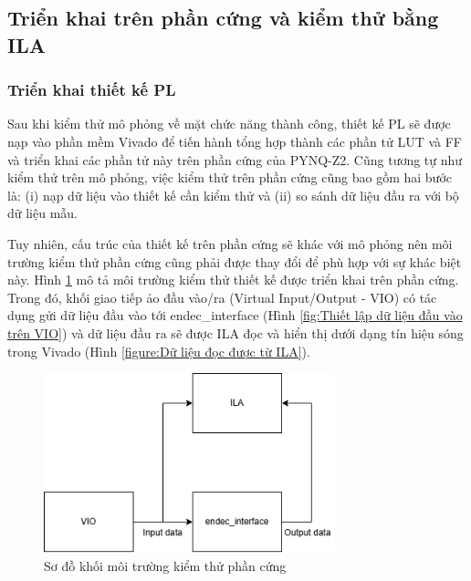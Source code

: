 \documentclass[../DoAn.tex]{subfiles}
\begin{document}
\subsection{Triển khai trên phần cứng và kiểm thử bằng ILA}
\subsubsection{Triển khai thiết kế PL}
\label{subsubsection:Triển khai thiết kế PL}
Sau khi kiểm thử mô phỏng về mặt chức năng thành công, thiết kế PL sẽ được nạp vào phần mềm Vivado để tiến hành tổng hợp thành các phần tử LUT và FF và triển khai các phần tử này trên phần cứng của PYNQ-Z2. Cũng tương tự như kiểm thử trên mô phỏng, việc kiểm thử trên phần cứng cũng bao gồm hai bước là: (i) nạp dữ liệu vào thiết kế cần kiểm thử và (ii) so sánh dữ liệu đầu ra với bộ dữ liệu mẫu.

Tuy nhiên, cấu trúc của thiết kế trên phần cứng sẽ khác với mô phỏng nên môi trường kiểm thử phần cứng cũng phải được thay đổi để phù hợp với sự khác biệt này. Hình \ref{fig:Sơ đồ khối môi trường kiểm thử phần cứng} mô tả môi trường kiểm thử thiết kế được triển khai trên phần cứng. Trong đó, khối giao tiếp ảo đầu vào/ra (Virtual Input/Output - VIO) có tác dụng gửi dữ liệu đầu vào tới endec\_interface (Hình \ref{fig:Thiết lập dữ liệu đầu vào trên VIO}) và dữ liệu đầu ra sẽ được ILA đọc và hiển thị dưới dạng tín hiệu sóng trong Vivado (Hình \ref{figure:Dữ liệu đọc được từ ILA}). 

\begin{figure}[H]
    \centering
    \includegraphics[width=0.75\textwidth, height=0.15\textheight, keepaspectratio]{Hinhve/Chuong 4/ILA block.png}
    \caption{Sơ đồ khối môi trường kiểm thử phần cứng}
    \label{fig:Sơ đồ khối môi trường kiểm thử phần cứng}
\end{figure}
\end{document}
